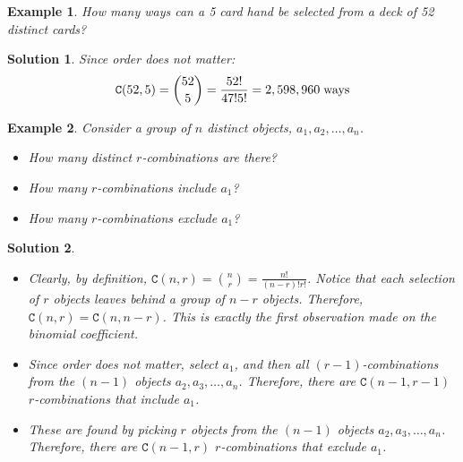 \documentclass[12pt, letterpaper, onecolumn, conference, final]{IEEEtran}
\theoremstyle{definition}
\theoremstyle{plain}
\newtheorem{example}{Example}[section]
\newtheorem{solution}{Solution}[section]
\begin{document}
\begin{example}
How many ways can a 5 card hand be selected from a deck of 52 distinct cards?
\end{example}
\begin{solution}
Since order does not matter:
\begin{equation*}
\mathtt{C}(52,5) = {52 \choose 5} = \frac{52!}{47!5!} = 2,598,960 \hspace{.1cm} \text{ways}
\end{equation*}
\end{solution}

\newpage
\begin{example}
Consider a group of $n$ distinct objects, $a_1,a_2,\dots,a_n$.
\begin{itemize}

\item[(a)]
How many distinct $r$-combinations are there?

\vspace{.2cm}
\item[(b)]
How many $r$-combinations include $a_1$?

\vspace{.2cm}
\item[(c)]
How many $r$-combinations exclude $a_1$?

\end{itemize}
\end{example}
\begin{solution}
\hfill
\begin{itemize}

\item[(a)]
Clearly, by definition, $\mathtt{C}(n,r) = {n \choose r} = \frac{n!}{(n-r)!r!}$. Notice that each selection of $r$ objects leaves behind a group of $n-r$ objects. Therefore, $\mathtt{C}(n,r) = \mathtt{C}(n,n-r)$. This is exactly the first observation made on the binomial coefficient.

\vspace{.2cm}
\item[(b)]
Since order does not matter, select $a_1$, and then all $(r-1)$-combinations from the $(n-1)$ objects $a_2,a_3,\dots,a_n$. Therefore, there are $\mathtt{C}(n-1,r-1)$ $r$-combinations that include $a_1$.

\vspace{.2cm}
\item[(c)]
These are found by picking $r$ objects from the $(n-1)$ objects $a_2,a_3,\dots,a_n$. Therefore, there are $\mathtt{C}(n-1,r)$ $r$-combinations that exclude $a_1$.

\end{itemize}
\end{solution}
\end{document}
